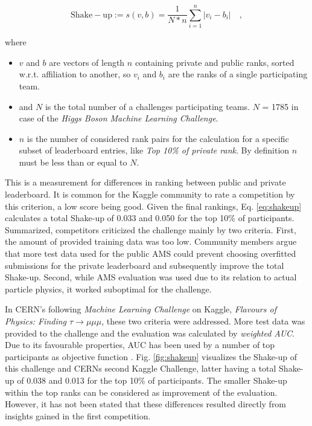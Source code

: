 \begin{equation}\label{eq:shakeup}
	\mathrm{Shake-up}:= s(v,b)= \frac{1}{N*n} \sum\limits_{i=1}^n |v_i-b_i| \mathrm{\hspace{1em},}
\end{equation}

where \begin{itemize}
	\item $v$ and $b$ are vectors of length $n$ containing private and public ranks, sorted w.r.t. affiliation to another, so $v_i$ and $b_i$ are the ranks of a single participating team.
	\item and $N$ is the total number of a challenges participating teams. $N$ = 1785 in case of the \emph{Higgs Boson Machine Learning Challenge}. 
	\item $n$ is the number of considered rank pairs for the calculation for a specific subset of leaderboard entries, like \emph{Top 10\% of private rank}. By definition $n$ must be less than or equal to $N$.
\end{itemize}

This is a measurement for differences in ranking between public and private leaderboard. It is common for the Kaggle community to rate a competition by this criterion, a low score being good. Given the final rankings, Eq. \eqref{eq:shakeup} calculates a total Shake-up of 0.033 and 0.050 for the top 10\% of participants. Summarized, competitors criticized the challenge mainly by two criteria. First, the amount of provided training data was too low. Community members argue that more test data used for the public AMS could prevent choosing overfitted submissions for the private leaderboard and subsequently improve the total Shake-up\cite{kaggleForum1,kaggleForum2}. Second, while AMS evaluation was used due to its relation to actual particle physics, it worked suboptimal for the challenge.

In CERN's following \emph{Machine Learning Challenge} on Kaggle, \emph{Flavours of Physics: Finding $\tau \rightarrow \mu\mu\mu$}, these two criteria were addressed. More test data was provided to the challenge and the evaluation was calculated by \emph{weighted AUC}. Due to its favourable properties, AUC has been used by a number of top participants as objective function \cite{diaz14}. Fig. \ref{fig:shakeup} visualizes the Shake-up of this challenge and CERNs second Kaggle Challenge, latter having a total Shake-up of 0.038 and 0.013 for the top 10\% of participants. The smaller Shake-up within the top ranks can be considered as improvement of the evaluation.
However, it has not been stated that these differences resulted directly from insights gained in the first competition.

